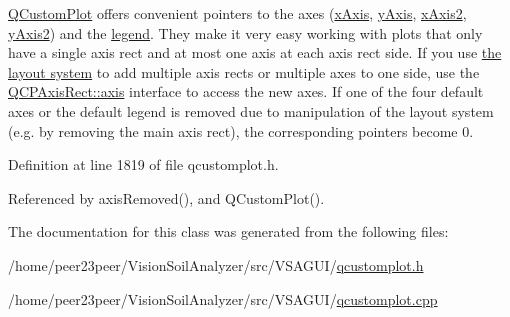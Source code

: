 \hyperlink{class_q_custom_plot}{Q\+Custom\+Plot} offers convenient pointers to the axes (\hyperlink{class_q_custom_plot_a9a79cd0158a4c7f30cbc702f0fd800e4}{x\+Axis}, \hyperlink{class_q_custom_plot_af6fea5679725b152c14facd920b19367}{y\+Axis}, \hyperlink{class_q_custom_plot_ada41599f22cad901c030f3dcbdd82fd9}{x\+Axis2}, \hyperlink{class_q_custom_plot_af13fdc5bce7d0fabd640f13ba805c0b7}{y\+Axis2}) and the \hyperlink{class_q_custom_plot_a4eadcd237dc6a09938b68b16877fa6af}{legend}. They make it very easy working with plots that only have a single axis rect and at most one axis at each axis rect side. If you use \hyperlink{}{the layout system} to add multiple axis rects or multiple axes to one side, use the \hyperlink{class_q_c_p_axis_rect_a560de44e47a4af0f86c59102a094b1e4}{Q\+C\+P\+Axis\+Rect\+::axis} interface to access the new axes. If one of the four default axes or the default legend is removed due to manipulation of the layout system (e.\+g. by removing the main axis rect), the corresponding pointers become 0. 

Definition at line 1819 of file qcustomplot.\+h.



Referenced by axis\+Removed(), and Q\+Custom\+Plot().



The documentation for this class was generated from the following files\+:\begin{DoxyCompactItemize}
\item 
/home/peer23peer/\+Vision\+Soil\+Analyzer/src/\+V\+S\+A\+G\+U\+I/\hyperlink{qcustomplot_8h}{qcustomplot.\+h}\item 
/home/peer23peer/\+Vision\+Soil\+Analyzer/src/\+V\+S\+A\+G\+U\+I/\hyperlink{qcustomplot_8cpp}{qcustomplot.\+cpp}\end{DoxyCompactItemize}
